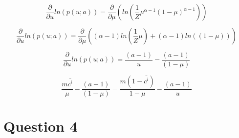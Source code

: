 \documentclass[a4paper, 12pt]{article}
\begin{document}
$$\frac{\partial}{\partial u} ln(p(u;a)) = \frac{\partial}{\partial \mu} \left(ln(\frac{1}{Z}\mu^{\alpha - 1} \left(1-\mu\right)^{\alpha -1})\right)$$

$$\frac{\partial}{\partial u} ln(p(u;a)) = \frac{\partial}{\partial \mu} \left((\alpha - 1)ln(\frac{1}{Z}\mu) + (\alpha -1)ln(\left(1-\mu\right))\right)$$

$$\frac{\partial}{\partial u} ln(p(u;a)) = \frac{(a-1)}{u} - \frac{(a-1)}{(1-\mu)}$$

$$\frac{m\bar{c^i}}{\mu}   - \frac{(a-1)}{(1-\mu)} =  \frac{m\left(1-\bar{c^i}\right)}{1-\mu} - \frac{(a-1)}{u}$$


\section*{Question 4}
\end{document}
